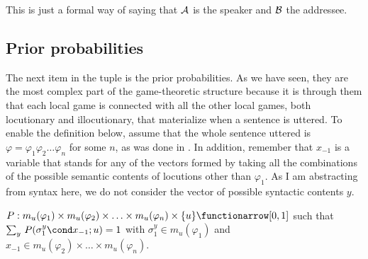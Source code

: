 \noindent This is just a formal way of saying that $\cal A$ is the speaker and $\cal B$ the addressee.



\subsection{Prior probabilities}\label{sec:A.4.4}

The next item in the tuple is the prior probabilities. As we have seen, they are the most complex part of the game-theoretic structure because it is through them that each local game is connected with all the other local games, both locutionary and illocutionary, that materialize when a sentence is uttered. To enable the definition below, assume that the whole sentence uttered is $\varphi = \varphi_1\varphi_2\ldots\varphi_n$ for some $n$, as was done in . In addition, remember that $x_{-1}$ is a variable that stands for any of the vectors formed by taking all the combinations of the possible semantic contents of locutions other than $\varphi_1$. As I am abstracting from syntax here, we do not consider the vector of possible syntactic contents $y$.

\begin{definition} $P: m_u(\varphi_1) \times m_u(\varphi_2) \times \ldots \times m_u(\varphi_n) \times \{u\} \functionarrow [0,1]$ such that $\sum_y\, P(\sigma_1^{y} \cond x_{-1}; u) = 1$ with $\sigma_1^{y} \in m_u(\varphi_1)$ and $x_{-1} \in m_u(\varphi_2) \times \ldots \times m_u(\varphi_n)$.
\end{definition}



